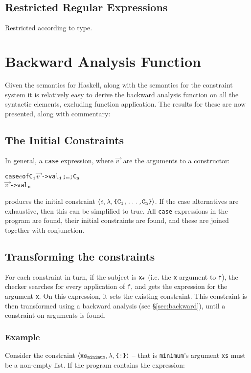 \documentclass[preprint]{sigplanconf}
\newcommand{\T}[1]{\texttt{#1}}
\newcommand{\tup}[1]{\ensuremath{\langle #1 \rangle}}
\newcounter{exmp}
\newcommand{\yesexample}{\subsubsection*{Example \arabic{exmp}}\addtocounter{exmp}{1}}
\newenvironment{code}{\begin{alltt}\small}{\end{alltt}}
\renewcommand{\c}[3]{\tup{\T{#1},\T{#2},\T{\{#3\}}}}
\newcommand{\cc}[2]{\c{#1}{$\lambda$}{#2}}
\newcommand{\s}[1]{\ensuremath{_{\tt #1}}} %
\newcommand{\vecto}[1]{\overrightarrow{#1\;}}
\begin{document}
\subsection{Restricted Regular Expressions}

Restricted according to type.

\section{Backward Analysis Function}
\label{chap:backward}

Given the semantics for Haskell, along with the semantics for the constraint
system it is relatively easy to derive the backward analysis function on all
the syntactic elements, excluding function application. The results for these
are now presented, along with commentary:

\subsection{The Initial Constraints}

In general, a \T{case} expression, where $\vecto{v}$ are the
arguments to a constructor:

\begin{code}
case \(e\) of {C\s{1} \(\vecto{v}\) -> val\s{1}; \ldots; C\s{n}
\(\vecto{v}\) -> val\s{n}}
\end{code}

\noindent produces the initial constraint
\cc{$e$}{C\s{1},\ldots,C\s{n}}. If the case alternatives are
exhaustive, then this can be simplified to true. All \T{case}
expressions in the program are found, their initial constraints are
found, and these are joined together with conjunction.

\subsection{Transforming the constraints}

For each constraint in turn, if the subject is \T{x\s{f}} (i.e. the
\T{x} argument to \T{f}), the checker searches for every application
of \T{f}, and gets the expression for the argument \T{x}. On this
expression, it sets the existing constraint. This constraint is then
transformed using a backward analysis (see \S\ref{sec:backward}),
until a constraint on arguments is found.

\yesexample

Consider the constraint \cc{xs\s{minimum}}{:} -- that is
\T{minimum}'s argument \T{xs} must be a non-empty list. If the
program contains the expression:
\end{document}
